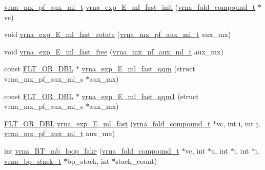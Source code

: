 \begin{DoxyCompactItemize}
\item 
\mbox{\hyperlink{group__loops_ga39a8cc1385dcb542a60a9393cde6a1e3}{vrna\+\_\+mx\+\_\+pf\+\_\+aux\+\_\+ml\+\_\+t}} \mbox{\hyperlink{group__loops_gace7640e156900ba8b01edc1a7136b2b7}{vrna\+\_\+exp\+\_\+\+E\+\_\+ml\+\_\+fast\+\_\+init}} (\mbox{\hyperlink{group__fold__compound_ga1b0cef17fd40466cef5968eaeeff6166}{vrna\+\_\+fold\+\_\+compound\+\_\+t}} $\ast$vc)
\item 
void \mbox{\hyperlink{group__loops_gabc73c029027ba09bfe70e2318052f0ae}{vrna\+\_\+exp\+\_\+\+E\+\_\+ml\+\_\+fast\+\_\+rotate}} (\mbox{\hyperlink{group__loops_ga39a8cc1385dcb542a60a9393cde6a1e3}{vrna\+\_\+mx\+\_\+pf\+\_\+aux\+\_\+ml\+\_\+t}} aux\+\_\+mx)
\item 
void \mbox{\hyperlink{group__loops_ga3bbc24b3950867b039104ce8b4f39346}{vrna\+\_\+exp\+\_\+\+E\+\_\+ml\+\_\+fast\+\_\+free}} (\mbox{\hyperlink{group__loops_ga39a8cc1385dcb542a60a9393cde6a1e3}{vrna\+\_\+mx\+\_\+pf\+\_\+aux\+\_\+ml\+\_\+t}} aux\+\_\+mx)
\item 
const \mbox{\hyperlink{group__data__structures_ga31125aeace516926bf7f251f759b6126}{F\+L\+T\+\_\+\+O\+R\+\_\+\+D\+BL}} $\ast$ \mbox{\hyperlink{group__loops_gadb5ec8ebfe72254dace68f3693376643}{vrna\+\_\+exp\+\_\+\+E\+\_\+ml\+\_\+fast\+\_\+qqm}} (struct vrna\+\_\+mx\+\_\+pf\+\_\+aux\+\_\+ml\+\_\+s $\ast$aux\+\_\+mx)
\item 
const \mbox{\hyperlink{group__data__structures_ga31125aeace516926bf7f251f759b6126}{F\+L\+T\+\_\+\+O\+R\+\_\+\+D\+BL}} $\ast$ \mbox{\hyperlink{group__loops_ga38ecb773ebbc084d563339919152bcf7}{vrna\+\_\+exp\+\_\+\+E\+\_\+ml\+\_\+fast\+\_\+qqm1}} (struct vrna\+\_\+mx\+\_\+pf\+\_\+aux\+\_\+ml\+\_\+s $\ast$aux\+\_\+mx)
\item 
\mbox{\hyperlink{group__data__structures_ga31125aeace516926bf7f251f759b6126}{F\+L\+T\+\_\+\+O\+R\+\_\+\+D\+BL}} \mbox{\hyperlink{group__loops_ga567d730fc5389b94d6ee545e42412d6c}{vrna\+\_\+exp\+\_\+\+E\+\_\+ml\+\_\+fast}} (\mbox{\hyperlink{group__fold__compound_ga1b0cef17fd40466cef5968eaeeff6166}{vrna\+\_\+fold\+\_\+compound\+\_\+t}} $\ast$vc, int i, int j, \mbox{\hyperlink{group__loops_ga39a8cc1385dcb542a60a9393cde6a1e3}{vrna\+\_\+mx\+\_\+pf\+\_\+aux\+\_\+ml\+\_\+t}} aux\+\_\+mx)
\item 
int \mbox{\hyperlink{group__loops_ga0272e774406ec70a97c231d03bef330b}{vrna\+\_\+\+B\+T\+\_\+mb\+\_\+loop\+\_\+fake}} (\mbox{\hyperlink{group__fold__compound_ga1b0cef17fd40466cef5968eaeeff6166}{vrna\+\_\+fold\+\_\+compound\+\_\+t}} $\ast$vc, int $\ast$u, int $\ast$i, int $\ast$j, \mbox{\hyperlink{group__data__structures_gaa651bda42e7692f08cb603cd6834b0ee}{vrna\+\_\+bp\+\_\+stack\+\_\+t}} $\ast$bp\+\_\+stack, int $\ast$stack\+\_\+count)

\end{DoxyCompactItemize}
